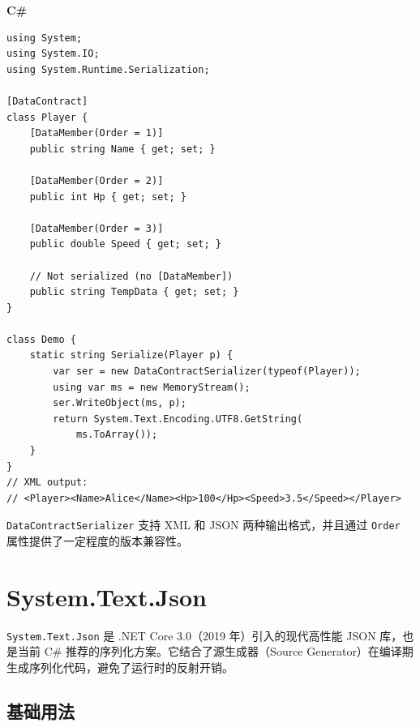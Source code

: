 \documentclass[12pt,a4paper,fontset=fandol]{ctexbook}
\newcommand{\Tp}[1]{\texttt{#1}}
\newcommand{\csharplabel}{%
  \noindent\begin{tcolorbox}[colback=csharpheadbg,coltext=white,
    sharp corners,boxrule=0pt,width=3.2em,height=1.4em,
    halign=center,valign=center,nobeforeafter,left=0pt,right=0pt,
    top=0pt,bottom=0pt]\small\bfseries C\#\end{tcolorbox}}
\begin{document}
\csharplabel
\begin{lstlisting}[style=csharpstyle,caption={C\#: DataContract 序列化}]
using System;
using System.IO;
using System.Runtime.Serialization;

[DataContract]
class Player {
    [DataMember(Order = 1)]
    public string Name { get; set; }

    [DataMember(Order = 2)]
    public int Hp { get; set; }

    [DataMember(Order = 3)]
    public double Speed { get; set; }

    // Not serialized (no [DataMember])
    public string TempData { get; set; }
}

class Demo {
    static string Serialize(Player p) {
        var ser = new DataContractSerializer(typeof(Player));
        using var ms = new MemoryStream();
        ser.WriteObject(ms, p);
        return System.Text.Encoding.UTF8.GetString(
            ms.ToArray());
    }
}
// XML output:
// <Player><Name>Alice</Name><Hp>100</Hp><Speed>3.5</Speed></Player>
\end{lstlisting}

\Tp{DataContractSerializer} 支持 XML 和 JSON 两种输出格式，并且通过 \Tp{Order} 属性提供了一定程度的版本兼容性。

\chapter{System.Text.Json}\label{ch:stj}

\Tp{System.Text.Json} 是 .NET Core 3.0（2019 年）引入的现代高性能 JSON 库，也是当前 C\# 推荐的序列化方案。它结合了源生成器（Source Generator）在编译期生成序列化代码，避免了运行时的反射开销。

\section{基础用法}\label{sec:stj-basic}
\end{document}
